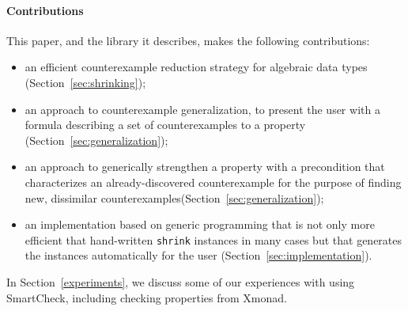 \documentclass[10pt]{sigplanconf}
\newcommand{\ttp}[1]{\texttt{#1}}
\begin{document}

\paragraph{Contributions}
This paper, and the library it describes, makes the following contributions:

\begin{itemize}

\item an efficient counterexample reduction strategy for algebraic
  data types (Section~\ref{sec:shrinking});

\item an approach to counterexample generalization, to present the user with a
  formula describing a set of counterexamples to a property
  (Section~\ref{sec:generalization});

\item an approach to generically strengthen a property with a precondition that
  characterizes an already-discovered counterexample for the purpose of finding
  new, dissimilar counterexamples(Section~\ref{sec:generalization});

\item an implementation based on generic programming that is not only more
  efficient that hand-written \ttp{shrink} instances in many cases but that
  generates the instances automatically for the user
  (Section~\ref{sec:implementation}).

\end{itemize}

\noindent
In Section~\ref{experiments}, we discuss some of our experiences with using
SmartCheck, including checking properties from Xmonad.

\end{document}
